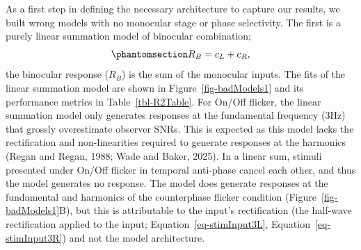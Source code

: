 \documentclass[
  12pt,
]{article}
\begin{document}
As a first step in defining the necessary architecture to capture our
results, we built wrong models with no monocular stage or phase
selectivity. The first is a purely linear summation model of binocular
combination; \begin{equation}\phantomsection\label{eq-linearSumModel}{
R_B = c_L+c_R,
}\end{equation} the binocular response (\(R_B\)) is the sum of the
monocular inputs. The fits of the linear summation model are shown in
Figure~\ref{fig-badModels1} and its performance metrics in
Table~\ref{tbl-R2Table}. For On/Off flicker, the linear summation model
only generates responses at the fundamental frequency (3Hz) that grossly
overestimate observer SNRs. This is expected as this model lacks the
rectification and non-linearities required to generate responses at the
harmonics (Regan and Regan, 1988; Wade and Baker, 2025). In a linear
sum, stimuli presented under On/Off flicker in temporal anti-phase
cancel each other, and thus the model generates no response. The model
does generate responses at the fundamental and harmonics of the
counterphase flicker condition (Figure~\ref{fig-badModels1}B), but this
is attributable to the input's rectification (the half-wave
rectification applied to the input;
Equation~\ref{eq-stimInput3L}, Equation~\ref{eq-stimInput3R}) and not
the model architecture.
\end{document}
